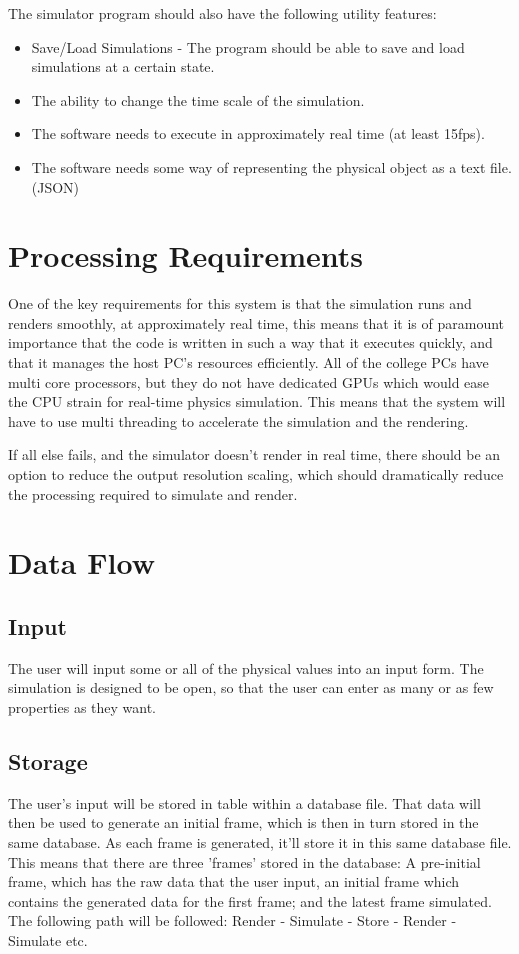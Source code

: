 The simulator program should also have the following utility features:
\begin{itemize}
	\item Save/Load Simulations - The program should be able to save and load simulations at a certain state.
	\item The ability to change the time scale of the simulation.
	\item The software needs to execute in approximately real time (at least 15fps).
	\item The software needs some way of representing the physical object as a text file. (JSON)

\end{itemize}

\section{Processing Requirements}
One of the key requirements for this system is that the simulation runs and renders smoothly, at approximately real time, this means that it is of paramount importance that the code is written in such a way that it executes quickly, and that it manages the host PC's resources efficiently. All of the college PCs have multi core processors, but they do not have dedicated GPUs which would ease the CPU strain for real-time physics simulation. This means that the system will have to use multi threading to accelerate the simulation and the rendering.

If all else fails, and the simulator doesn't render in real time, there should be an option to reduce the output resolution scaling, which should dramatically reduce the processing required to simulate and render.

\section{Data Flow}
\subsection{Input}
	The user will input some or all of the physical values into an input form. The simulation is designed to be open, so that the user can enter as many or as few properties as they want.

\subsection{Storage}
	The user's input will be stored in table within a database file. That data will then be used to generate an initial frame, which is then in turn stored in the same database. As each frame is generated, it'll store it in this same database file. This means that there are three 'frames' stored in the database: A pre-initial frame, which has the raw data that the user input, an initial frame which contains the generated data for the first frame; and the latest frame simulated. The following path will be followed: Render - Simulate - Store - Render - Simulate etc.

